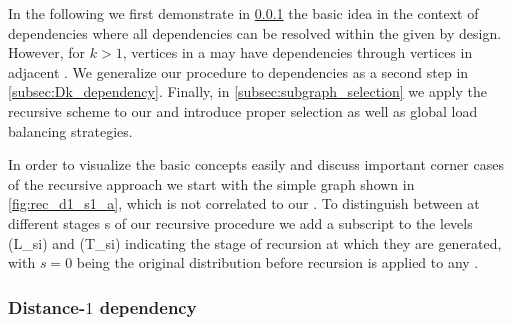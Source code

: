 In the following we first demonstrate in \cref{subsec:D1_dependency} the basic idea in the context of \DONE dependencies where all dependencies can be resolved within the given \levelGroup by design. However, for $k>1$, vertices in a \levelGroup may have \DK dependencies through vertices in adjacent \levelGroups. We generalize our procedure to \DK dependencies as a second step in \cref{subsec:Dk_dependency}. Finally, in \cref{subsec:subgraph_selection} we apply the recursive scheme to our \stex and introduce proper \subgraph selection as well as global load balancing strategies. 

In order to visualize the basic concepts easily and discuss important corner cases of the recursive approach we start with the simple graph shown in \cref{fig:rec_d1_s1_a}, which is not correlated to our \stex. To distinguish between \levelGroups at different stages \acrshort{s} of our recursive procedure we add a subscript to the levels (\acrshort{L_si}) and \levelGroups (\acrshort{T_si}) indicating the stage of recursion at which they are generated, with $s=0$ being the original distribution before recursion is applied to any \subgraph. 

	
	\subsubsection{Distance-$1$ dependency} \label{subsec:D1_dependency}

